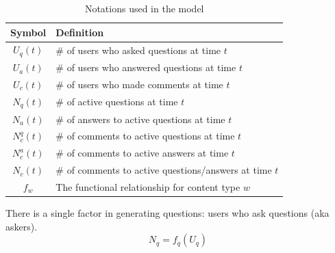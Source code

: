 \begin{table}[thb]
	\vspace{-0.5\baselineskip}
	\caption{Notations used in the model}
    \vspace{-\baselineskip}
    \label{tab:notations}
	\begin{center}    
	\begin{tabular}{cl}
	\toprule Symbol & Definition\\ \midrule
	$U_q(t)$ & \# of users who asked questions at time $t$\\ 
	$U_a(t)$ & \# of users who answered questions at time $t$\\
	$U_c(t)$ & \# of users who made comments at time $t$\\
	$N_q(t)$ & \# of active questions at time $t$\\
	$N_a(t)$ & \# of answers to active questions at time $t$\\
	$N_c^q(t)$ & \# of comments to active questions at time $t$\\
	$N_c^a(t)$ & \# of comments to active answers at time $t$\\
    $N_c(t)$ & \# of comments to active questions/answers at time $t$\\
	$f_w$ & The functional relationship for content type $w$\\ \bottomrule
	\end{tabular}
    \end{center}
    \vspace{-\baselineskip}   
\end{table}

There is a single factor in generating questions: users who ask questions (aka askers).
\begin{equation*}
N_q = f_q(U_q)
\end{equation*}

